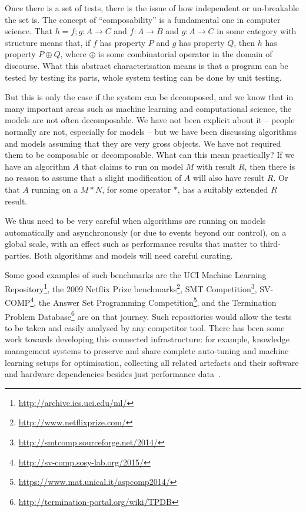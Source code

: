 \documentclass[conference]{IEEEtran}
\begin{document}
Once there is a set of tests, there is the issue of how independent or
un-breakable the set is.  The concept of ``composability'' is a 
fundamental one in computer science.  That $h = f; g : A \rightarrow C$
and $f : A \rightarrow B$ and $g : A \rightarrow C$ in some category
with structure means that, if $f$ has property $P$ and $g$ has
property $Q$, then $h$ has property $P \oplus Q$, where $\oplus$ is
some combinatorial operator in the domain of discourse. What this
abstract characterisation means is that a program can be tested by
testing its parts, whole system testing can be done by unit testing.

But this is only the case if the system can be decomposed, and we know
that in many important areas such as machine learning and computational
science, the models are not often decomposable.  We have not
been explicit about it -- people normally are not, especially for
models -- but we have been discussing algorithms and models assuming
that they are very gross objects. We have not required them to be
composable or decomposable. What can this mean practically? If we
have an algorithm $A$ that claims to run on model $M$ with result $R$,
then there is no reason to assume that a slight modification of $A$
will also have result $R$. Or that $A$ running on a $M * N$, for some
operator $*$, has a suitably extended $R$ result.

We thus need to be very careful when algorithms are running on models
automatically and asynchronously (or due to events beyond our
control), on a global scale, with an effect such as performance
results that matter to third-parties. Both algorithms and models will
need careful curating.

Some good examples of such benchmarks are the UCI Machine Learning
Repository\footnote{\url{http://archive.ics.uci.edu/ml/}}, the 2009
Netflix Prize benchmarks\footnote{\url{http://www.netflixprize.com/}},
SMT Competition\footnote{\url{http://smtcomp.sourceforge.net/2014/}},
SV-COMP\footnote{\url{http://sv-comp.sosy-lab.org/2015/}}, the Answer
Set Programming
Competition\footnote{\url{https://www.mat.unical.it/aspcomp2014/}},
and the Termination Problem
Database\footnote{\url{http://termination-portal.org/wiki/TPDB}} are
on that journey. Such repositories would allow the tests to be taken
and easily analysed by any competitor tool. There has been some work
towards developing this connected infrastructure: for example,
knowledge management systems to preserve and share complete
auto-tuning and machine learning setups for optimisation, collecting
all related artefacts and their software and hardware dependencies
besides just performance data~\cite{fursin-et-al:2014}.
\end{document}
